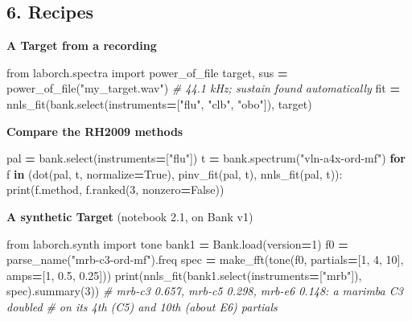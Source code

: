 \documentclass[
  10pt,
]{article}
\newenvironment{Shaded}{\begin{snugshade}}{\end{snugshade}}
\newcommand{\BuiltInTok}[1]{#1}
\newcommand{\CommentTok}[1]{\textcolor[rgb]{0.56,0.35,0.01}{\textit{#1}}}
\newcommand{\ControlFlowTok}[1]{\textcolor[rgb]{0.13,0.29,0.53}{\textbf{#1}}}
\newcommand{\DecValTok}[1]{\textcolor[rgb]{0.00,0.00,0.81}{#1}}
\newcommand{\FloatTok}[1]{\textcolor[rgb]{0.00,0.00,0.81}{#1}}
\newcommand{\ImportTok}[1]{#1}
\newcommand{\KeywordTok}[1]{\textcolor[rgb]{0.13,0.29,0.53}{\textbf{#1}}}
\newcommand{\NormalTok}[1]{#1}
\newcommand{\OperatorTok}[1]{\textcolor[rgb]{0.81,0.36,0.00}{\textbf{#1}}}
\newcommand{\StringTok}[1]{\textcolor[rgb]{0.31,0.60,0.02}{#1}}
\newcommand{\VariableTok}[1]{\textcolor[rgb]{0.00,0.00,0.00}{#1}}
\begin{document}
\subsection{6. Recipes}

\textbf{A Target from a recording}

\begin{Shaded}
\begin{Highlighting}[]
\ImportTok{from}\NormalTok{ laborch.spectra }\ImportTok{import}\NormalTok{ power\_of\_file}
\NormalTok{target, sus }\OperatorTok{=}\NormalTok{ power\_of\_file(}\StringTok{"my\_target.wav"}\NormalTok{)  }\CommentTok{\# 44.1 kHz; sustain found automatically}
\NormalTok{fit }\OperatorTok{=}\NormalTok{ nnls\_fit(bank.select(instruments}\OperatorTok{=}\NormalTok{[}\StringTok{"flu"}\NormalTok{, }\StringTok{"clb"}\NormalTok{, }\StringTok{"obo"}\NormalTok{]), target)}
\end{Highlighting}
\end{Shaded}

\textbf{Compare the RH2009 methods}

\begin{Shaded}
\begin{Highlighting}[]
\NormalTok{pal }\OperatorTok{=}\NormalTok{ bank.select(instruments}\OperatorTok{=}\NormalTok{[}\StringTok{"flu"}\NormalTok{])}
\NormalTok{t }\OperatorTok{=}\NormalTok{ bank.spectrum(}\StringTok{"vln{-}a4x{-}ord{-}mf"}\NormalTok{)}
\ControlFlowTok{for}\NormalTok{ f }\KeywordTok{in}\NormalTok{ (dot(pal, t, normalize}\OperatorTok{=}\VariableTok{True}\NormalTok{), pinv\_fit(pal, t), nnls\_fit(pal, t)):}
    \BuiltInTok{print}\NormalTok{(f.method, f.ranked(}\DecValTok{3}\NormalTok{, nonzero}\OperatorTok{=}\VariableTok{False}\NormalTok{))}
\end{Highlighting}
\end{Shaded}

\textbf{A synthetic Target} (notebook 2.1, on Bank v1)

\begin{Shaded}
\begin{Highlighting}[]
\ImportTok{from}\NormalTok{ laborch.synth }\ImportTok{import}\NormalTok{ tone}
\NormalTok{bank1 }\OperatorTok{=}\NormalTok{ Bank.load(version}\OperatorTok{=}\DecValTok{1}\NormalTok{)}
\NormalTok{f0 }\OperatorTok{=}\NormalTok{ parse\_name(}\StringTok{"mrb{-}c3{-}ord{-}mf"}\NormalTok{).freq}
\NormalTok{spec }\OperatorTok{=}\NormalTok{ make\_fft(tone(f0, partials}\OperatorTok{=}\NormalTok{[}\DecValTok{1}\NormalTok{, }\DecValTok{4}\NormalTok{, }\DecValTok{10}\NormalTok{], amps}\OperatorTok{=}\NormalTok{[}\DecValTok{1}\NormalTok{, }\FloatTok{0.5}\NormalTok{, }\FloatTok{0.25}\NormalTok{]))}
\BuiltInTok{print}\NormalTok{(nnls\_fit(bank1.select(instruments}\OperatorTok{=}\NormalTok{[}\StringTok{"mrb"}\NormalTok{]), spec).summary(}\DecValTok{3}\NormalTok{))}
\CommentTok{\# mrb{-}c3 0.657, mrb{-}c5 0.298, mrb{-}e6 0.148: a marimba C3 doubled}
\CommentTok{\# on its 4th (C5) and 10th (about E6) partials}
\end{Highlighting}
\end{Shaded}
\end{document}
